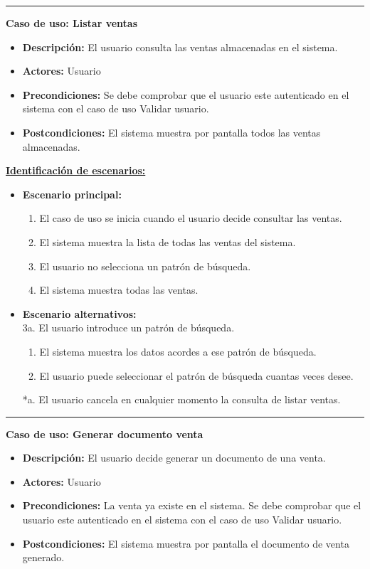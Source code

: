 \smallskip
\hrule height 1pt
\smallskip
\textbf{Caso de uso: Listar ventas}
\begin{itemize}\renewcommand{\labelitemi}{$\cdot$}
 \item \textbf{Descripción:} El usuario consulta las ventas almacenadas en el sistema.
  \item \textbf{Actores:} Usuario
  \item \textbf{Precondiciones:} Se debe comprobar que el usuario este autenticado en el sistema con el caso de uso Validar usuario.
  \item \textbf{Postcondiciones:} El sistema muestra por pantalla todos las ventas almacenadas.
\end{itemize}
\underline{\textbf{Identificación de escenarios:}}
\begin{itemize}\renewcommand{\labelitemi}{$\circ$}
 \item \textbf{Escenario principal:}
         \begin{enumerate}
          \item El caso de uso se inicia cuando el usuario decide consultar las ventas.
          \item El sistema muestra la lista de todas las ventas del sistema.
          \item El usuario no selecciona un patrón de búsqueda.
          \item El sistema muestra todas las ventas.
         \end{enumerate}
  \item \textbf{Escenario alternativos:}\\
  			3a. El usuario introduce un patrón de búsqueda.
  			\begin{enumerate}
  			\item El sistema muestra los datos acordes a ese patrón de búsqueda.
  			\item El usuario puede seleccionar el patrón de búsqueda cuantas veces desee.
  			\end{enumerate}
          *a. El usuario cancela en cualquier momento la consulta de listar ventas.
\end{itemize}
\smallskip
\hrule height 1pt
\smallskip
\textbf{Caso de uso: Generar documento venta}
\begin{itemize}\renewcommand{\labelitemi}{$\cdot$}
 \item \textbf{Descripción:} El usuario decide generar un documento de una venta.
  \item \textbf{Actores:} Usuario
  \item \textbf{Precondiciones:} La venta ya existe en el sistema. Se debe comprobar que el usuario este autenticado en el sistema con el caso de uso Validar usuario.
  \item \textbf{Postcondiciones:} El sistema muestra por pantalla el documento de venta generado.
\end{itemize}
